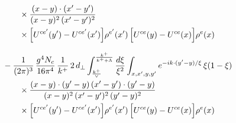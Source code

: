 \documentclass[10pt]{article}
\begin{document}
\begin{align}
&\qquad\times\frac{(x-y)\cdot(x'-y')}{(x-y)^{2}\,(x'-y')^{2}}\notag\\
&\qquad\times\Big[U^{ce'}(y')-U^{ce'}(x')\Big]\rho^{e'}(x')\,\Big[U^{ce}(y)-U^{ce}(x)\Big]\rho^{e}(x)\notag\\[8pt]
&-\frac{1}{(2\pi)^{3}}\,\frac{g^{4}N_{c}}{16\pi^{4}}\,\frac{1}{k^{+}}\,2\,d_{\perp}\int_{\frac{k^{+}}{\vee}}^{\frac{k^{+}}{k^{+}+\Lambda}}\frac{d\xi}{\xi^{2}}\int_{x,x',y,y'}e^{-ik\cdot(y'-y)/\xi}\,\xi(1-\xi)\notag\\
&\qquad\times\frac{(x-y)\cdot(y'-y)\,(x'-y')\cdot(y'-y)}{(x-y)^{2}\,(x'-y')^{2}\,(y'-y)^{2}}\notag\\
&\qquad\times\Big[U^{ce'}(y')-U^{ce'}(x')\Big]\rho^{e'}(x')\,\Big[U^{ce}(y)-U^{ce}(x)\Big]\rho^{e}(x)
\end{align}
\end{document}
